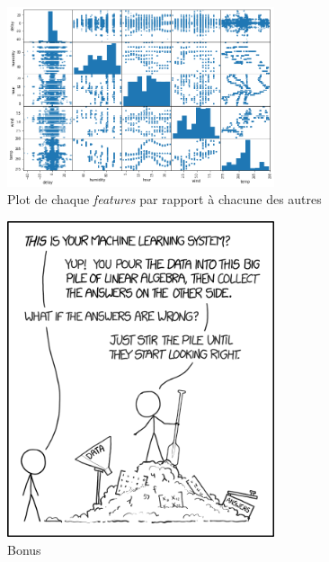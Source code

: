 \begin{appendices}
    \begin{figure}[ht]
        \centering
        \includegraphics[width=0.7\textwidth]{images/scatter_matrix.png}
        \caption{Plot de chaque \textit{features} par rapport à chacune des autres}
        \label{appendix:scatter_matrix}
    \end{figure}

    \begin{figure}[ht]
        \centering
        \includegraphics[width=0.7\textwidth]{images/bonus.png}
        \caption{Bonus}
        \label{appendix:bonus}
    \end{figure}

\end{appendices}